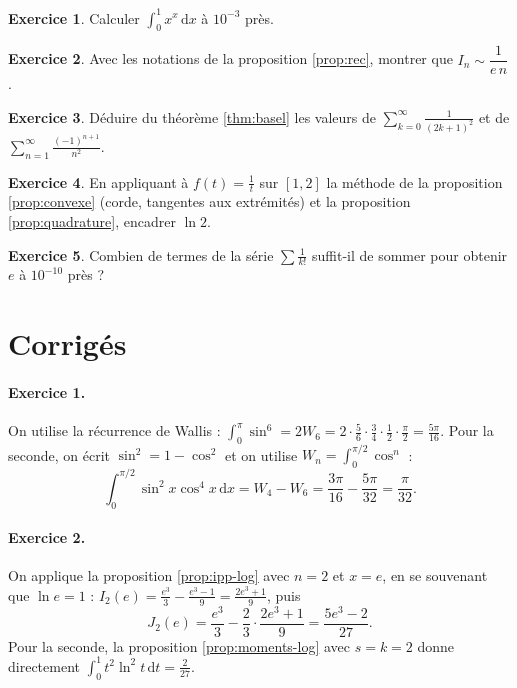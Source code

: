 \documentclass[11pt,a4paper]{article}
\theoremstyle{plain}
\theoremstyle{definition}
\newtheorem{exercice}{Exercice}
\theoremstyle{remark}
\newcommand{\dd}{\,\mathrm{d}}
\begin{document}
\begin{exercice}
Calculer $\int_0^1x^x\dd x$ à $10^{-3}$ près.
\end{exercice}

\begin{exercice}\label{exo:equiv}
Avec les notations de la proposition \ref{prop:rec}, montrer que $I_n\sim\dfrac1{e\,n}$.
\end{exercice}

\begin{exercice}
Déduire du théorème \ref{thm:basel} les valeurs de $\displaystyle\sum_{k=0}^\infty\frac1{(2k+1)^2}$ et de $\displaystyle\sum_{n=1}^\infty\frac{(-1)^{n+1}}{n^2}$.
\end{exercice}

\begin{exercice}
En appliquant à $f(t)=\frac1t$ sur $[1,2]$ la méthode de la proposition \ref{prop:convexe} (corde, tangentes aux extrémités) et la proposition \ref{prop:quadrature}, encadrer $\ln2$.
\end{exercice}

\begin{exercice}
Combien de termes de la série $\sum\frac1{k!}$ suffit-il de sommer pour obtenir $e$ à $10^{-10}$ près ?
\end{exercice}

\section{Corrigés}

\paragraph{Exercice 1.} On utilise la récurrence de Wallis : $\int_0^\pi\sin^6=2W_6=2\cdot\frac56\cdot\frac34\cdot\frac12\cdot\frac\pi2=\frac{5\pi}{16}$. Pour la seconde, on écrit $\sin^2=1-\cos^2$ et on utilise $W_n=\int_0^{\pi/2}\cos^n$ :
\[
  \int_0^{\pi/2}\sin^2x\cos^4x\dd x=W_4-W_6=\frac{3\pi}{16}-\frac{5\pi}{32}=\frac\pi{32}.
\]

\paragraph{Exercice 2.} On applique la proposition \ref{prop:ipp-log} avec $n=2$ et $x=e$, en se souvenant que $\ln e=1$ : $I_2(e)=\frac{e^3}3-\frac{e^3-1}9=\frac{2e^3+1}9$, puis
\[
  J_2(e)=\frac{e^3}3-\frac23\cdot\frac{2e^3+1}9=\frac{5e^3-2}{27}.
\]
Pour la seconde, la proposition \ref{prop:moments-log} avec $s=k=2$ donne directement $\int_0^1t^2\ln^2t\dd t=\frac{2}{27}$.
\end{document}
